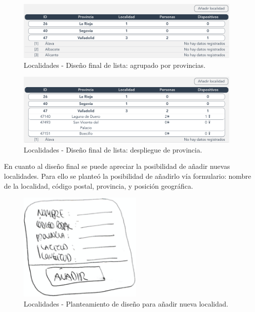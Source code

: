 \begin{enumerate}
    \begin{figure}[H]   
        \centering
        \includegraphics[width=11cm]{./img/web2/locations.table.png}
        \caption{Localidades - Diseño final de lista: agrupado por provincias.}
        \label{fig:web.dir}
    \end{figure}
    
    \begin{figure}[H]   
        \centering
        \includegraphics[width=11cm]{./img/web2/locations.table.opened.png}
        \caption{Localidades - Diseño final de lista: despliegue de provincia.}
        \label{fig:web.dir}
    \end{figure}
    
    En cuanto al diseño final se puede apreciar la posibilidad de añadir nuevas localidades. Para ello se planteó la posibilidad de añadirlo vía formulario: nombre de la localidad, código postal, provincia, y posición geográfica.
    
    \begin{figure}[H]   
        \centering
        \includegraphics[width=6cm]{./img/web/locations/locations.add.pre.png}
        \caption{Localidades - Planteamiento de diseño para añadir nueva localidad.}
        \label{fig:location.add.post}
    \end{figure}
    

\end{enumerate}
